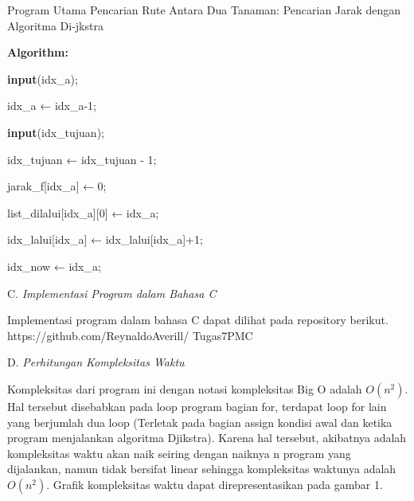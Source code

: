 \documentclass[conference]{IEEEtran}
\begin{document}
\begin{algorithm}
    \caption{Program Utama Pencarian Rute Antara Dua Tanaman: Pencarian
    Jarak dengan Algoritma Di-jkstra}
    \textbf{Algorithm:}

    \textbf{input}(idx\_a);

    idx\_a ← idx\_a-1;

    \textbf{input}(idx\_tujuan);

    idx\_tujuan ← idx\_tujuan - 1;


    jarak\_f[idx\_a] ← 0;

    list\_dilalui[idx\_a][0] ← idx\_a;

    idx\_lalui[idx\_a] ← idx\_lalui[idx\_a]+1;

    idx\_now ← idx\_a;
    
\end{algorithm}

C. \textit{Implementasi Program dalam Bahasa C}

Implementasi program dalam bahasa C dapat dilihat
pada repository berikut. https://github.com/ReynaldoAverill/
Tugas7PMC


D. \textit{Perhitungan Kompleksitas Waktu}

Kompleksitas dari program ini dengan notasi kompleksitas
Big O adalah $O(n^2)$. Hal tersebut disebabkan pada loop
program bagian for, terdapat loop for lain yang berjumlah
dua loop (Terletak pada bagian assign kondisi awal dan ketika
program menjalankan algoritma Djikstra). Karena hal tersebut,
akibatnya adalah kompleksitas waktu akan naik seiring dengan
naiknya n program yang dijalankan, namun tidak bersifat
linear sehingga kompleksitas waktunya adalah $O(n^2)$. Grafik
kompleksitas waktu dapat direpresentasikan pada gambar 1.





\end{document}
